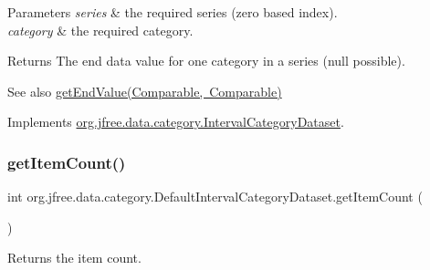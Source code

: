 \begin{DoxyParams}{Parameters}
{\em series} & the required series (zero based index). \\
\hline
{\em category} & the required category.\\
\hline
\end{DoxyParams}
\begin{DoxyReturn}{Returns}
The end data value for one category in a series (null possible).
\end{DoxyReturn}
\begin{DoxySeeAlso}{See also}
\mbox{\hyperlink{classorg_1_1jfree_1_1data_1_1category_1_1_default_interval_category_dataset_a6b536be218d6a7cafe97ef2d26c85c38}{get\+End\+Value(\+Comparable, Comparable)}} 
\end{DoxySeeAlso}


Implements \mbox{\hyperlink{interfaceorg_1_1jfree_1_1data_1_1category_1_1_interval_category_dataset_af83cb9f655ea175391fed773b2e478cb}{org.\+jfree.\+data.\+category.\+Interval\+Category\+Dataset}}.

\mbox{\label{classorg_1_1jfree_1_1data_1_1category_1_1_default_interval_category_dataset_a565a96d7e8d9e7dee48ce40be982a54a}} 
\subsubsection{\texorpdfstring{get\+Item\+Count()}{getItemCount()}}
{\footnotesize\ttfamily int org.\+jfree.\+data.\+category.\+Default\+Interval\+Category\+Dataset.\+get\+Item\+Count (\begin{DoxyParamCaption}{ }\end{DoxyParamCaption})}

Returns the item count.

